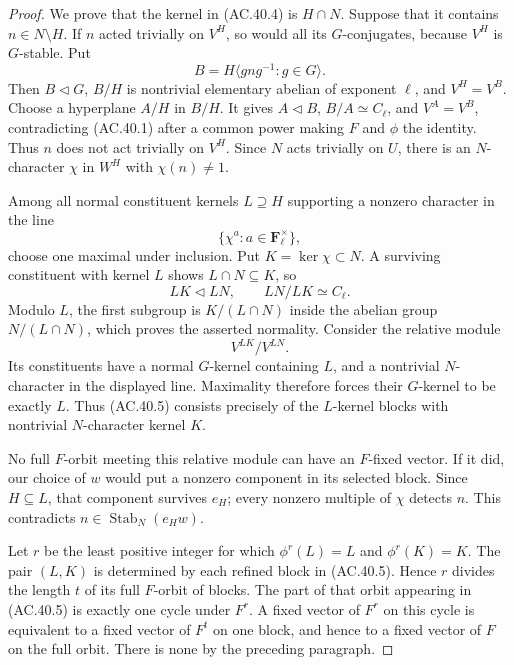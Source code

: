 \begin{proof}
We prove that the kernel in (AC.40.4) is \(H\cap N\).
Suppose that it contains \(n\in N\setminus H\).
If \(n\) acted trivially on \(V^H\), so would all its
\(G\)-conjugates, because \(V^H\) is \(G\)-stable. Put
\[
 B=H\langle gng^{-1}:g\in G\rangle.
\]
Then \(B\triangleleft G\), \(B/H\) is nontrivial
elementary abelian of exponent \(\ell\), and
\(V^H=V^B\). Choose a hyperplane \(A/H\) in \(B/H\).
It gives \(A\triangleleft B\), \(B/A\simeq C_\ell\),
and \(V^A=V^B\), contradicting (AC.40.1) after a
common power making \(F\) and \(\phi\) the identity.
Thus \(n\) does not act trivially on \(V^H\).
Since \(N\) acts trivially on \(U\),
there is an \(N\)-character \(\chi\) in \(W^H\)
with \(\chi(n)\ne1\).

Among all normal constituent kernels \(L\supseteq H\)
supporting a nonzero character in the line
\[
                 \{\chi^a: a\in\mathbf F_\ell^\times\},
\]
choose one maximal under inclusion. Put
\(K=\ker\chi\subset N\). A surviving constituent with
kernel \(L\) shows \(L\cap N\subseteq K\), so
\[
                         LK\triangleleft LN,\qquad
                         LN/LK\simeq C_\ell.
\]
Modulo \(L\), the first subgroup is
\(K/(L\cap N)\) inside the abelian group
\(N/(L\cap N)\), which proves the asserted normality.
Consider the relative module
\[
                         V^{LK}/V^{LN}.
                         \tag{AC.40.5}
\]
Its constituents have a normal \(G\)-kernel containing
\(L\), and a nontrivial \(N\)-character in the displayed
line. Maximality therefore forces their \(G\)-kernel
to be exactly \(L\). Thus (AC.40.5) consists precisely
of the \(L\)-kernel blocks with nontrivial \(N\)-character
kernel \(K\).

No full \(F\)-orbit meeting this relative module can
have an \(F\)-fixed vector. If it did, our choice of
\(w\) would put a nonzero component in its selected
block. Since \(H\subseteq L\), that component survives
\(e_H\); every nonzero multiple of \(\chi\) detects
\(n\). This contradicts \(n\in\operatorname{Stab}_N(e_Hw)\).

Let \(r\) be the least positive integer for which
\(\phi^r(L)=L\) and \(\phi^r(K)=K\). The pair \((L,K)\)
is determined by each refined block in (AC.40.5).
Hence \(r\) divides the length \(t\) of its full
\(F\)-orbit of blocks. The part of that orbit appearing
in (AC.40.5) is exactly one cycle under \(F^r\).
A fixed vector of \(F^r\) on this cycle is equivalent
to a fixed vector of \(F^t\) on one block, and hence
to a fixed vector of \(F\) on the full orbit.
There is none by the preceding paragraph.


\end{proof}
